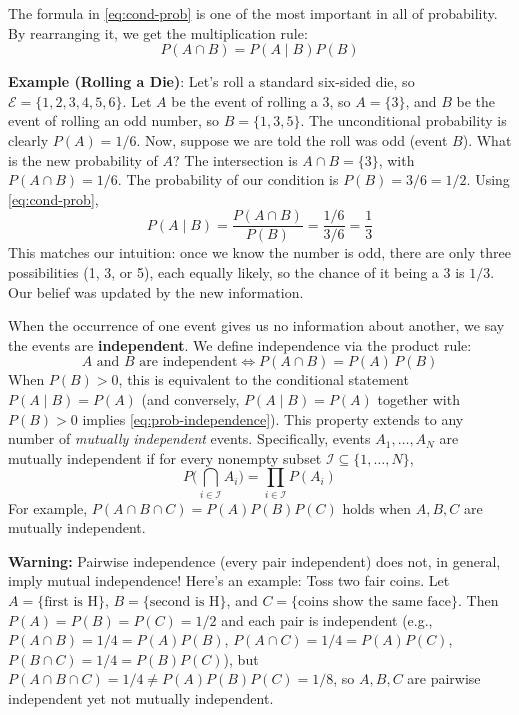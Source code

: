 The formula in \autoref{eq:cond-prob} is one of the most important in all of probability. By rearranging it, we get the multiplication rule:
\begin{equation}
    P(A \cap B) = P(A \mid B)P(B)
    \label{eq:mult-rule}
\end{equation}

\begin{exampleBox}
    \textbf{Example (Rolling a Die)}: Let's roll a standard six-sided die, so $\mathcal{E} = \{1, 2, 3, 4, 5, 6\}$. Let $A$ be the event of rolling a 3, so $A=\{3\}$, and $B$ be the event of rolling an odd number, so $B=\{1, 3, 5\}$. The unconditional probability is clearly $P(A) = 1/6$. Now, suppose we are told the roll was odd (event $B$). What is the new probability of $A$? The intersection is $A \cap B = \{3\}$, with $P(A \cap B)=1/6$. The probability of our condition is $P(B)=3/6 = 1/2$. Using \autoref{eq:cond-prob}, 
    \begin{equation}
        P(A \mid B) = \frac{P(A \cap B)}{P(B)} = \frac{1/6}{3/6} = \frac{1}{3}
    \end{equation}
    This matches our intuition: once we know the number is odd, there are only three possibilities (1, 3, or 5), each equally likely, so the chance of it being a 3 is $1/3$. Our belief was updated by the new information.
\end{exampleBox}

When the occurrence of one event gives us no information about another, we say the events are \textbf{independent}. We define independence via the product rule:
\begin{equation}
    \text{$A$ and $B$ are independent} \iff P(A \cap B) = P(A)\,P(B)
    \label{eq:prob-independence}
\end{equation}
When $P(B)>0$, this is equivalent to the conditional statement $P(A\mid B)=P(A)$ (and conversely, $P(A\mid B)=P(A)$ together with $P(B)>0$ implies \autoref{eq:prob-independence}). This property extends to any number of \emph{mutually independent} events. Specifically, events $A_1,\dots,A_N$ are mutually independent if for every nonempty subset $\mathcal{I}\subseteq\{1,\dots,N\}$,
\begin{equation}
    P\!\Big(\bigcap_{i\in \mathcal{I}} A_i\Big) = \prod_{i\in \mathcal{I}} P(A_i)
\end{equation}
For example, $P(A\cap B\cap C)=P(A)P(B)P(C)$ holds when $A,B,C$ are mutually independent.

\begin{warningBox}
    \textbf{Warning:} Pairwise independence (every pair independent) does not, in general, imply mutual independence! Here's an example: Toss two fair coins. Let $A=\{\text{first is H}\}$, $B=\{\text{second is H}\}$, and $C=\{\text{coins show the same face}\}$. Then $P(A)=P(B)=P(C)=1/2$ and each pair is independent (e.g., $P(A\cap B)=1/4=P(A)P(B)$, $P(A\cap C)=1/4=P(A)P(C)$, $P(B\cap C)=1/4=P(B)P(C)$), but $P(A\cap B\cap C)=1/4 \neq P(A)P(B)P(C)=1/8$, so $A,B,C$ are pairwise independent yet not mutually independent.
\end{warningBox}


